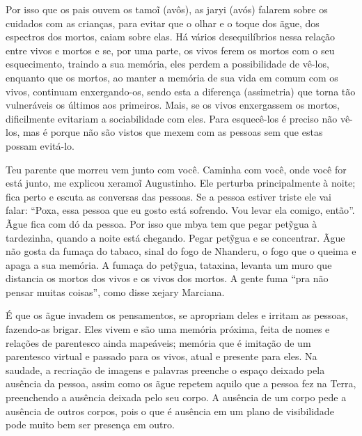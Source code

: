 \documentclass{article}
\begin{document}
Por isso que os pais ouvem os tamo\~{i} (av\^os), as jaryi (av\'os)
falarem sobre os cuidados com as crian\c{c}as, para evitar que o olhar
e o toque dos \~ague, dos espectros dos mortos, caiam sobre elas. H\'a
v\'arios desequil\'ibrios nessa rela\c{c}\~ao entre vivos e mortos e
se, por uma parte, os vivos ferem os mortos com o seu esquecimento,
traindo a sua mem\'oria, eles perdem a possibilidade de v\^e-los,
enquanto que os mortos, ao manter a mem\'oria de sua vida em comum com
os vivos, continuam enxergando-os, sendo esta a diferen\c{c}a
(assimetria) que torna t\~ao vulner\'aveis os \'ultimos aos primeiros.
Mais, se os vivos enxergassem os mortos, dificilmente evitariam a
sociabilidade com eles. Para esquec\^e-los \'e preciso n\~ao v\^e-los,
mas \'e porque n\~ao s\~ao vistos que mexem com as pessoas sem que
estas possam evit\'a-lo.

{\textquotedbl}Teu parente que morreu vem junto com voc\^e. Caminha com
voc\^e, onde voc\^e for est\'a junto{\textquotedbl}, me explicou
xeramo\~{i} Augustinho. Ele perturba principalmente \`a noite; fica
perto e escuta as conversas das pessoas. Se a pessoa estiver triste ele
vai falar: {\textquotedblleft}Poxa, essa pessoa que eu gosto est\'a
sofrendo. Vou levar ela comigo, ent\~ao{\textquotedblright}. \~Ague
fica com d\'o da pessoa. Por isso que mbya tem que pegar pet\~{y}gua
\`a tardezinha, quando a noite est\'a chegando. Pegar pet\~{y}gua e se
concentrar. \~Ague n\~ao gosta da fuma\c{c}a do tabaco, sinal do fogo
de Nhanderu, o fogo que o queima e apaga a sua mem\'oria. A fuma\c{c}a
do pet\~{y}gua, tataxina, levanta um muro que distancia os mortos dos
vivos e os vivos dos mortos. A gente fuma {\textquotedblleft}pra n\~ao
pensar muitas coisas{\textquotedblright}, como disse xejary Marciana.

\'E que os \~ague invadem os pensamentos, se apropriam deles e irritam
as pessoas, fazendo-as brigar. Eles vivem e s\~ao uma mem\'oria
pr\'oxima, feita de nomes e rela\c{c}\~oes de parentesco ainda
mape\'aveis; mem\'oria que \'e imita\c{c}\~ao de um parentesco virtual
e passado para os vivos, atual e presente para eles. Na saudade, a
recria\c{c}\~ao de imagens e palavras preenche o espa\c{c}o deixado
pela aus\^encia da pessoa, assim como os \~ague repetem aquilo que a
pessoa fez na Terra, preenchendo a aus\^encia deixada pelo seu corpo. A
aus\^encia de um corpo pede a aus\^encia de outros corpos, pois o que
\'e aus\^encia em um plano de visibilidade pode muito bem ser
presen\c{c}a em outro. 
\end{document}
